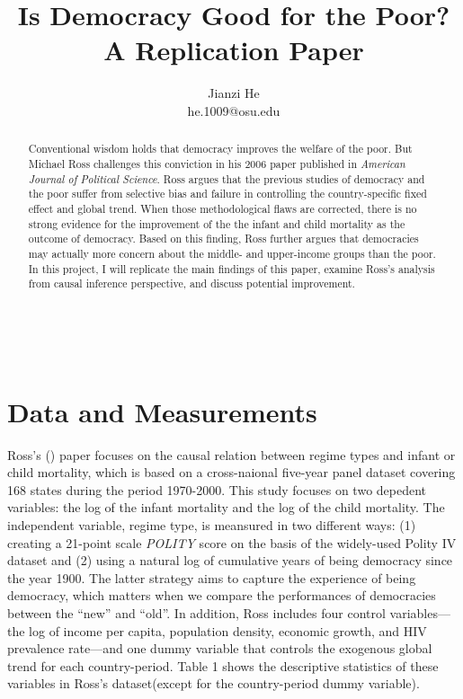\documentclass[12pt, lelterpaper, reqno]{article}\usepackage[]{graphicx}\usepackage[]{color}
\title{\textbf{Is Democracy Good for the Poor?\\ A Replication Paper}}
\author{Jianzi He\\ he.1009@osu.edu}
\begin{document}
\begin{titlepage}
\maketitle

\doublespacing
\
\
\begin{abstract}
Conventional wisdom holds that democracy improves the welfare of the poor. But Michael Ross challenges this conviction in his 2006 paper published in \textit{American Journal of Political Science}. Ross argues that the previous studies of democracy and the poor suffer from selective bias and failure in controlling the country-specific fixed effect and global trend. When those methodological flaws are corrected, there is no strong evidence for the improvement of the the infant and child mortality as the outcome of democracy. Based on this finding, Ross further argues that democracies may actually more concern about the middle- and upper-income groups than the poor. In this project, I will replicate the main findings of this paper, examine Ross's analysis from causal inference perspective, and discuss potential improvement.
\end{abstract}

\end{titlepage}


\section{Data and Measurements}
Ross's (\citeyear{ross2006democracy}) paper focuses on the causal relation between regime types and infant or child mortality, which is based on a cross-naional five-year panel dataset covering 168 states during the period 1970-2000. This study focuses on two depedent variables: the log of the infant mortality and the log of the child mortality. The independent variable, regime type, is meansured in two different ways: (1) creating a 21-point scale \textit{POLITY} score on the basis of the widely-used Polity IV dataset and (2) using a natural log of cumulative years of being democracy since the year 1900. The latter strategy aims to capture the experience of being democracy, which matters when we compare the performances of democracies between the ``new'' and ``old''. In addition, Ross includes four control variables---the log of income per capita, population density, economic growth, and HIV prevalence rate---and one dummy variable that controls the exogenous global trend for each country-period. Table 1 shows the descriptive statistics of these variables in Ross's dataset(except for the country-period dummy variable).
\end{document}
